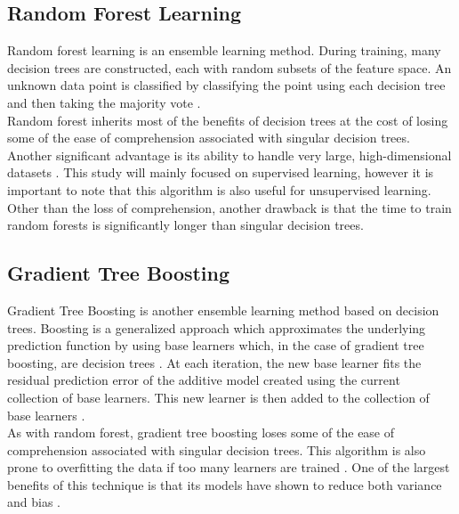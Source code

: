 \documentclass[titlepage]{article}
\begin{document}
\subsection{Random Forest Learning}
Random forest learning is an ensemble learning method. During training, many decision trees are constructed, each with random subsets of the feature space. An unknown data point is classified by classifying the point using each decision tree and then taking the majority vote \cite{RandomForestOG}.\\
Random forest inherits most of the benefits of decision trees at the cost of losing some of the ease of comprehension associated with singular decision trees. Another significant advantage is its ability to handle very large, high-dimensional datasets \cite{RandomForestHighDim}. This study will mainly focused on supervised learning, however it is important to note that this algorithm is also useful for unsupervised learning. Other than the loss of comprehension, another drawback is that the time to train random forests is significantly longer than singular decision trees.

\subsection{Gradient Tree Boosting}
Gradient Tree Boosting is another ensemble learning method based on decision trees. Boosting is a generalized approach which approximates the underlying prediction function by using base learners which, in the case of gradient tree boosting, are decision trees \cite{gradientBoostingOG}. At each iteration, the new base learner fits the residual prediction error of the additive model created using the current collection of base learners. This new learner is then added to the collection of base learners \cite{gradientBoostingOG}.\\
As with random forest, gradient tree boosting loses some of the ease of comprehension associated with singular decision trees. This algorithm is also prone to overfitting the data if too many learners are trained \cite{gradientBoostingDetails}. One of the largest benefits of this technique is that its models have shown to reduce both variance and bias \cite{gradientBoostingDetails}.
\end{document}
